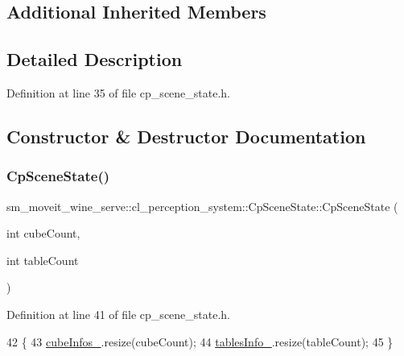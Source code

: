 \subsection*{Additional Inherited Members}


\subsection{Detailed Description}


Definition at line 35 of file cp\+\_\+scene\+\_\+state.\+h.



\subsection{Constructor \& Destructor Documentation}
\mbox{\label{classsm__moveit__wine__serve_1_1cl__perception__system_1_1CpSceneState_a9e2a7f4bdab17899c9336edb306ebdf2}} 
\subsubsection{\texorpdfstring{Cp\+Scene\+State()}{CpSceneState()}}
{\footnotesize\ttfamily sm\+\_\+moveit\+\_\+wine\+\_\+serve\+::cl\+\_\+perception\+\_\+system\+::\+Cp\+Scene\+State\+::\+Cp\+Scene\+State (\begin{DoxyParamCaption}\item[{int}]{cube\+Count,  }\item[{int}]{table\+Count }\end{DoxyParamCaption})\hspace{0.3cm}{\ttfamily [inline]}}



Definition at line 41 of file cp\+\_\+scene\+\_\+state.\+h.


\begin{DoxyCode}
42             \{
43                 \hyperlink{classsm__moveit__wine__serve_1_1cl__perception__system_1_1CpSceneState_a0b2d760a8ff2cb5e3735879d67ea3e67}{cubeInfos\_}.resize(cubeCount);
44                 \hyperlink{classsm__moveit__wine__serve_1_1cl__perception__system_1_1CpSceneState_aa6aea93bb143d2def50c97ec6b55e4cf}{tablesInfo\_}.resize(tableCount);
45             \}
\end{DoxyCode}


